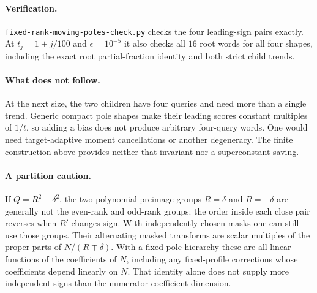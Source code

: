 \documentclass[11pt]{article}
\begin{document}
\paragraph{Verification.}
\texttt{fixed-rank-moving-poles-check.py} checks the four leading-sign
pairs exactly. At $t_j=1+j/100$ and $\epsilon=10^{-5}$ it also checks
all $16$ root words for all four shapes, including the exact root
partial-fraction identity and both strict child trends.

\paragraph{What does not follow.}
At the next size, the two children have four queries and need more
than a single trend. Generic compact pole shapes make their leading
scores constant multiples of $1/t$, so adding a bias does not produce
arbitrary four-query words. One would need target-adaptive moment
cancellations or another degeneracy. The finite construction above
provides neither that invariant nor a superconstant saving.

\paragraph{A partition caution.}
If $Q=R^2-\delta^2$, the two polynomial-preimage groups $R=\delta$
and $R=-\delta$ are generally not the even-rank and odd-rank groups:
the order inside each close pair reverses when $R'$ changes sign.
With independently chosen masks one can still use those groups.
Their alternating masked transforms are scalar multiples of the
proper parts of $N/(R\mp\delta)$. With a fixed pole hierarchy these
are all linear functions of the coefficients of $N$, including any
fixed-profile corrections whose coefficients depend linearly on $N$.
That identity alone does not supply more independent signs than the
numerator coefficient dimension.
\end{document}
